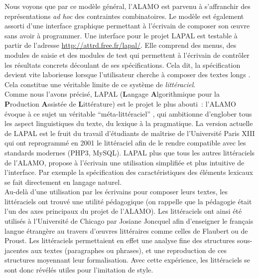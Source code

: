 \documentclass{article}
\begin{document}
					\vspace{2mm} 
					Nous voyons que par ce modèle général, l'ALAMO est parvenu à s'affranchir des représentations \textit{ad hoc} des contraintes combinatoires. Le modèle est également assorti d'une interface graphique permettant à l'écrivain de composer son œuvre sans avoir à programmer. Une interface pour le projet LAPAL est testable à partir de l'adresse \href{http://attrd.free.fr/lapal/}{http://attrd.free.fr/lapal/}. Elle comprend des menus, des modules de saisie et des modules de test qui permettent à l'écrivain de contrôler les résultats concrets découlant de ses spécifications. Cela dit, la spécification devient vite laborieuse lorsque l'utilisateur cherche à composer des textes longs \cite{alamo}. Cela constitue une véritable limite de ce système de \textit{littéraciel}.\\
					
					Comme nous l'avons précisé, LAPAL (\textbf{L}angage \textbf{A}lgorithmique pour la \textbf{P}roduction \textbf{A}ssistée de \textbf{L}ittérature) est le projet le plus abouti~: l'ALAMO évoque à ce sujet un véritable ``méta-littéraciel'' \cite{alamo}, qui ambitionne d'englober tous les aspect linguistiques du texte, du lexique à la pragmatique. La version actuelle de LAPAL est le fruit du travail d'étudiants de maîtrise de l'Université Paris XIII qui ont reprogrammé en 2001 le littéraciel afin de le rendre compatible avec les standards modernes (PHP3, MySQL). LAPAL plus que tous les autres littéraciels de l'ALAMO, propose à l'écrivain une utilisation simplifiée et plus intuitive de l'interface. Par exemple la spécification des caractéristiques des éléments lexicaux se fait directement en langage naturel.\\
					
					Au-delà d'une utilisation par les écrivains pour composer leurs textes, les littéraciels ont trouvé une utilité pédagogique (on rappelle que la pédagogie était l'un des axes principaux du projet de l'ALAMO). Les littéraciels ont ainsi été utilisés à l'Université de Chicago par Josiane Joncquel afin d'enseigner le français langue étrangère au travers d'œuvres littéraires comme celles de Flaubert ou de Proust. Les littéraciels permettaient en effet une analyse fine des structures sous-jacentes aux textes (paragraphes ou phrases), et une reproduction de ces structures moyennant leur formalisation. Avec cette expérience, les littéraciels se sont donc révélés utiles pour l'imitation de style.
					
\end{document}
